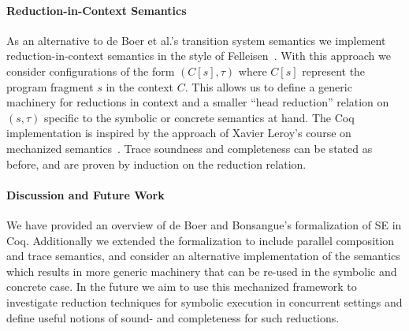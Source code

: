 \documentclass[submission,copyright,creativecommons]{eptcs}
\begin{document}
\paragraph{Reduction-in-Context Semantics}
As an alternative to de Boer et al.'s transition system semantics we implement reduction-in-context semantics in the
style of Felleisen~\cite{FELLEISEN1992235}.
With this approach we consider configurations of the form $(C[s], \tau)$ where $C[s]$ represent the program fragment
$s$ in the context $C$. This allows us to define a generic machinery for reductions in context and a smaller
``head reduction'' relation on $(s, \tau)$ specific to the symbolic or concrete semantics at hand.
The Coq implementation is inspired by the approach of Xavier Leroy's course on mechanized semantics~\cite{Leroy2020}.
Trace soundness and completeness can be stated as before, and are proven by induction on the reduction relation.

\paragraph{Discussion and Future Work}
We have provided an overview of de Boer and Bonsangue's formalization of SE in Coq.
Additionally we extended the formalization to include parallel composition and trace semantics,
and consider an alternative implementation of the semantics which results in more generic machinery
that can be re-used in the symbolic and concrete case.
In the future we aim to use this mechanized framework to investigate reduction techniques for symbolic
execution in concurrent settings and define useful notions of sound- and completeness for such reductions.



\end{document}
